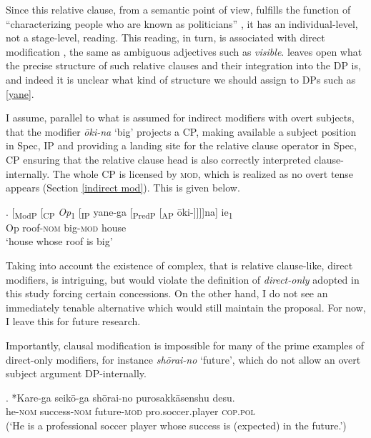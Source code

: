 Since this relative clause, from a semantic point of view, fulfills the function of ``characterizing people who are known as politicians'' \citep[139]{kim:2019:syntax}, it has an individual-level, not a stage-level, reading. This reading, in turn, is associated with direct modification \citep{cinque:2010:adj}, the same as ambiguous adjectives such as \textit{visible}. \citet{kim:2019:syntax} leaves open what the precise structure of such relative clauses and their integration into the DP is, and indeed it is unclear what kind of structure we should assign to DPs such as \ref{yane}.

I assume, parallel to what is assumed for indirect modifiers with overt subjects, that the modifier \textit{ōki-na} `big’ projects a CP, making available a subject position in Spec, IP and providing a landing site for the relative clause operator in Spec, CP ensuring that the relative clause head is also correctly interpreted clause-internally. The whole CP is licensed by \textsc{mod}, which is realized as no overt tense appears (Section \ref{indirect mod}). This is given below.

\exg. [\textsubscript{ModP} [\textsubscript{CP} \textit{Op}\textsubscript{1} [\textsubscript{IP} yane-ga [\textsubscript{PredP} [\textsubscript{AP} ōki-]]]]na] ie\textsubscript{1}\\
{} {} Op {} roof-\textsc{nom} {} {} big-\textsc{mod} house\\
`house whose roof is big’

Taking into account the existence of complex, that is relative clause-like, direct modifiers, is intriguing, but would violate the definition of \textit{direct-only} adopted in this study forcing certain concessions. On the other hand, I do not see an immediately tenable alternative which would still maintain the proposal. For now, I leave this for future research.

Importantly, clausal modification is impossible for many of the prime examples of direct-only modifiers, for instance \textit{shōrai-no} `future’, which do not allow an overt subject argument DP-internally.

\exg. *Kare-ga seikō-ga shōrai-no purosakkāsenshu desu.\\
he-\textsc{nom} success-\textsc{nom} future-\textsc{mod} pro.soccer.player \textsc{cop.pol}\\
(`He is a professional soccer player whose success is (expected) in the future.’)

